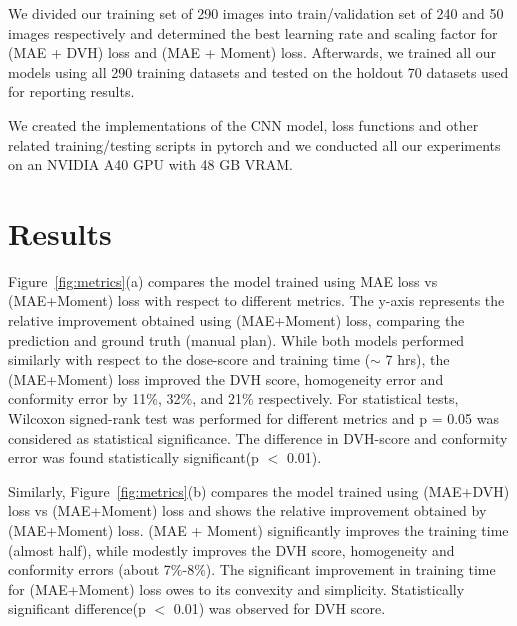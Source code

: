 \documentclass[10pt]{article}
\begin{document}
We divided our training set of 290 images into train/validation set of 240 and 50 images respectively and determined the best learning rate and scaling factor for (MAE + DVH) loss and (MAE + Moment) loss. Afterwards, we trained all our models using all 290 training datasets and tested on the holdout 70 datasets used for reporting results.

We created the implementations of the CNN model, loss functions and other related training/testing scripts in pytorch and we conducted all our experiments on an NVIDIA A40 GPU with 48 GB VRAM.

\section{Results}
{Figure~\ref{fig:metrics}(a) compares the model trained using MAE loss vs (MAE+Moment) loss with respect to different metrics. The y-axis represents the relative improvement obtained using (MAE+Moment) loss, comparing the prediction and ground truth (manual plan).   While both models performed similarly with respect to the dose-score and training time ($\sim$ 7 hrs), the (MAE+Moment) loss improved the DVH score, homogeneity error and conformity error by 11$\%$, 32$\%$, and 21$\%$ respectively. For statistical tests, Wilcoxon signed-rank test was performed for different metrics and p = 0.05 was considered as statistical significance. The difference in DVH-score and conformity error was found  statistically significant(p $<$ 0.01).}

{Similarly, Figure~\ref{fig:metrics}(b) compares the model trained using (MAE+DVH) loss vs (MAE+Moment) loss and shows the relative improvement obtained by (MAE+Moment) loss. (MAE + Moment) significantly improves the training time (almost half), while modestly improves the DVH score, homogeneity  and conformity errors (about 7$\%$-8$\%$). The significant improvement in training time for (MAE+Moment) loss  owes to its convexity and simplicity. Statistically significant difference(p $<$ 0.01) was observed for DVH score.}
\end{document}
